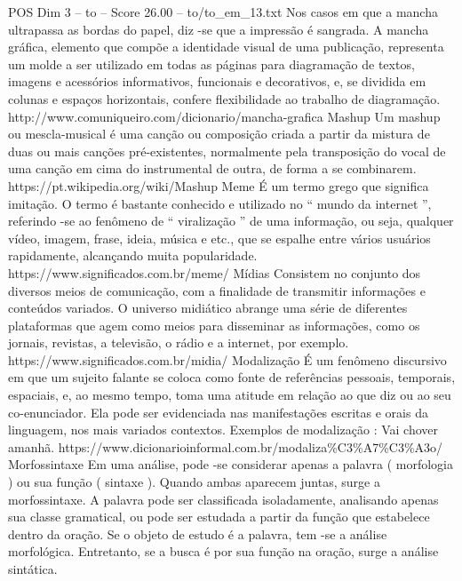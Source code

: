 \begin{textsample}{POS Dim 3 – to – Score 26.00 – to/to\_em\_13.txt}
Nos casos em que a mancha ultrapassa as bordas do papel, diz -se que a impressão é sangrada.
A mancha gráfica, elemento que compõe a identidade visual de uma publicação, representa um molde a ser utilizado em todas as páginas para diagramação de textos, imagens e acessórios informativos, funcionais e decorativos, e, se dividida em colunas e espaços horizontais, confere flexibilidade ao trabalho de diagramação. http://www.comuniqueiro.com/dicionario/mancha-grafica Mashup Um mashup ou mescla-musical é uma canção ou composição criada a partir da mistura de duas ou mais canções pré-existentes, normalmente pela transposição do vocal de uma canção em cima do instrumental de outra, de forma a se combinarem. https://pt.wikipedia.org/wiki/Mashup Meme É um termo grego que significa imitação.
O termo é bastante conhecido e utilizado no “ mundo da internet ”, referindo -se ao fenômeno de “ viralização ” de uma informação, ou seja, qualquer vídeo, imagem, frase, ideia, música e etc., que se espalhe entre vários usuários rapidamente, alcançando muita popularidade. https://www.significados.com.br/meme/ Mídias Consistem no conjunto dos diversos meios de comunicação, com a finalidade de transmitir informações e conteúdos variados.
O universo midiático abrange uma série de diferentes plataformas que agem como meios para disseminar as informações, como os jornais, revistas, a televisão, o rádio e a internet, por exemplo. https://www.significados.com.br/midia/ Modalização É um fenômeno discursivo em que um sujeito falante se coloca como fonte de referências pessoais, temporais, espaciais, e, ao mesmo tempo, toma uma atitude em relação ao que diz ou ao seu co-enunciador.
Ela pode ser evidenciada nas manifestações escritas e orais da linguagem, nos mais variados contextos.
Exemplos de modalização : Vai chover amanhã. https://www.dicionarioinformal.com.br/modaliza\%C3\%A7\%C3\%A3o/ Morfossintaxe Em uma análise, pode -se considerar apenas a palavra ( morfologia ) ou sua função ( sintaxe ).
Quando ambas aparecem juntas, surge a morfossintaxe.
A palavra pode ser classificada isoladamente, analisando apenas sua classe gramatical, ou pode ser estudada a partir da função que estabelece dentro da oração.
Se o objeto de estudo é a palavra, tem -se a análise morfológica.
Entretanto, se a busca é por sua função na oração, surge a análise sintática.

\end{textsample}
